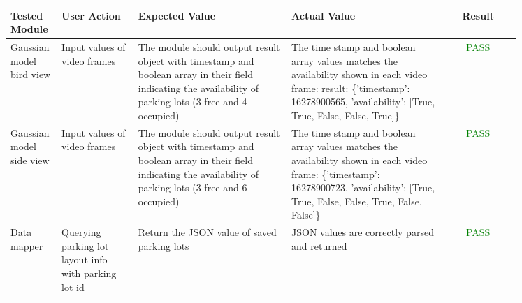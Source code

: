 \documentclass[12pt, titlepage]{article}
\begin{document}
\begin{center}
\begin{tabular}{|p{0.10\linewidth}|p{0.15\linewidth}|p{0.30\linewidth}|p{0.30\linewidth}|c|} 
\hline
\textbf{Tested Module} & \textbf{User Action} & \textbf{Expected Value} &
\textbf{Actual Value} & \textbf{Result} \\
\hline
Gaussian model bird view & Input values of video frames &  The module should
output result object with timestamp and boolean array in their field indicating
the availability of parking lots (3 free and 4 occupied) & The time stamp and
boolean array values matches the availability shown in each video frame: result:
\{'timestamp': 16278900565, 'availability': [True, True, False, False, True]\} &
\textcolor{Green}{PASS} \\
\hline
Gaussian model side view & Input values of video frames &  The module should
output result object with timestamp and boolean array in their field indicating
the availability of parking lots (3 free and 6 occupied)& The time stamp and
boolean array values matches the availability shown in each video frame:
\{'timestamp': 16278900723, 'availability': [True, True, False, False, True,
False, False]\}& \textcolor{Green}{PASS} \\
\hline
Data mapper & Querying parking lot layout info with parking lot id &  Return the
JSON value of saved parking lots & JSON values are correctly parsed and returned
& \textcolor{Green}{PASS} \\
\hline
\end{tabular}
\end{center}
\end{document}
